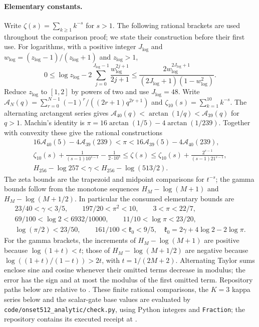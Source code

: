 \paragraph{Elementary constants.}
Write $\zeta(s)=\sum_{k\geq1}k^{-s}$ for $s>1$.
The following rational brackets are used throughout the comparison proof;
we state their construction before their first use. For logarithms, with a positive integer $J_{\log}$ and
$w_{\log}=(z_{\log}-1)/(z_{\log}+1)$ and $z_{\log}>1$,
\begin{equation}\label{ul:log-series}
 0\leq\log z_{\log}-2\sum_{j=0}^{J_{\log}-1}\frac{w_{\log}^{2j+1}}{2j+1}
 \leq\frac{2w_{\log}^{2J_{\log}+1}}{(2J_{\log}+1)(1-w_{\log}^2)}.
\end{equation}
Reduce $z_{\log}$ to $[1,2]$ by powers of two and use $J_{\log}=48$. Write
$\mathcal A_N(q)=\sum_{r=0}^{N-1}(-1)^r/((2r+1)q^{2r+1})$ and
$\zeta_{10}(s)=\sum_{k=1}^{10}k^{-s}$. The alternating arctangent series gives
$\mathcal A_{40}(q)<\arctan(1/q)<\mathcal A_{39}(q)$ for $q>1$.
Machin's identity is $\pi=16\arctan(1/5)-4\arctan(1/239)$.
Together with convexity these give the rational constructions
\[
 \begin{gathered}
 16\mathcal A_{40}(5)-4\mathcal A_{39}(239)<\pi
                <16\mathcal A_{39}(5)-4\mathcal A_{40}(239),\\
 \zeta_{10}(s)+\frac1{(s-1)10^{s-1}}-\frac1{2\cdot10^s}
 \leq\zeta(s)\leq \zeta_{10}(s)+\frac{2^{s-1}}{(s-1)21^{s-1}},\\
 H_{256}-\log257<\gamma<H_{256}-\log(513/2).
 \end{gathered}
\]
The zeta bounds are the trapezoid and midpoint comparisons for $t^{-s}$;
the gamma bounds follow from the monotone sequences $H_M-\log(M+1)$
and $H_M-\log(M+1/2)$.
In particular the consumed elementary bounds are
\[
\begin{gathered}
23/40<\gamma<3/5,\qquad197/20<\pi^2<10,\qquad3<\pi<22/7,\\
69/100<\log2<6932/10000,\qquad11/10<\log\pi<23/20,\\
\log(\pi/2)<23/50,\qquad161/100<\mathfrak k_0<9/5,
\quad\mathfrak k_0=2\gamma+4\log2-2\log\pi.
\end{gathered}
\]
For the gamma brackets, the increments of $H_M-\log(M+1)$ are
positive because $\log(1+t)<t$; those of
$H_M-\log(M+1/2)$ are negative because
$\log((1+t)/(1-t))>2t$, with $t=1/(2M+2)$.
Alternating Taylor sums enclose sine and cosine whenever their omitted
terms decrease in modulus; the error has the sign and at most the
modulus of the first omitted term.
Repository paths below are relative to
.
These finite rational comparisons, the $K=3$ kappa series below and the
scalar-gate base values are evaluated by
\texttt{code/onset512\_analytic/check.py}, using Python integers and
\texttt{Fraction}; the repository contains its executed receipt at
.

